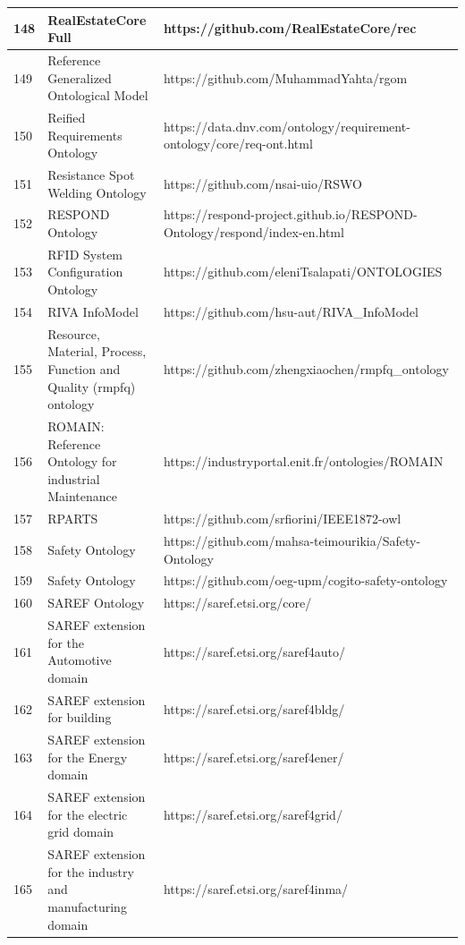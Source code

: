 \documentclass{article}
\begin{document}
\begin{table}[H]
{\begin{tabular}{|l|l|l|}
            148 & RealEstateCore Full & https://github.com/RealEstateCore/rec \\ \hline
            149 & Reference Generalized Ontological Model & https://github.com/MuhammadYahta/rgom \\ \hline
            150 & Reified Requirements Ontology & https://data.dnv.com/ontology/requirement-ontology/core/req-ont.html \\ \hline
            151 & Resistance Spot Welding Ontology & https://github.com/nsai-uio/RSWO \\ \hline
            152 & RESPOND Ontology & https://respond-project.github.io/RESPOND-Ontology/respond/index-en.html \\ \hline
            153 & RFID System Configuration Ontology & https://github.com/eleniTsalapati/ONTOLOGIES \\ \hline
            154 & RIVA InfoModel & https://github.com/hsu-aut/RIVA\_InfoModel \\ \hline
            155 & Resource, Material, Process, Function and Quality (rmpfq) ontology & https://github.com/zhengxiaochen/rmpfq\_ontology \\ \hline
            156 & ROMAIN: Reference Ontology for industrial Maintenance & https://industryportal.enit.fr/ontologies/ROMAIN \\ \hline
            157 & RPARTS & https://github.com/srfiorini/IEEE1872-owl \\ \hline
            158 & Safety Ontology & https://github.com/mahsa-teimourikia/Safety-Ontology \\ \hline
            159 & Safety Ontology & https://github.com/oeg-upm/cogito-safety-ontology \\ \hline
            160 & SAREF Ontology & https://saref.etsi.org/core/ \\ \hline
            161 & SAREF extension for the Automotive domain & https://saref.etsi.org/saref4auto/ \\ \hline
            162 & SAREF extension for building & https://saref.etsi.org/saref4bldg/ \\ \hline
            163 & SAREF extension for the Energy domain & https://saref.etsi.org/saref4ener/ \\ \hline
            164 & SAREF extension for the electric grid domain & https://saref.etsi.org/saref4grid/ \\ \hline
            165 & SAREF extension for the industry and manufacturing domain & https://saref.etsi.org/saref4inma/ \\ \hline

\end{tabular}}
\end{table}
\end{document}
